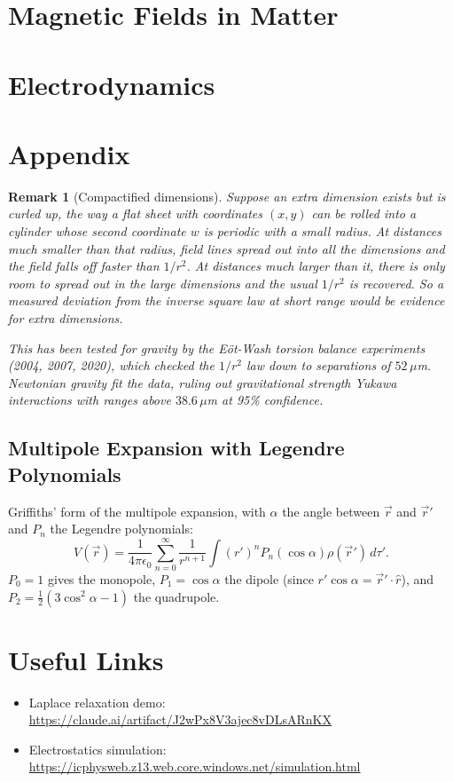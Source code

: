 \documentclass{article}
\newtheorem{remark}{Remark}
\begin{document}
\section{Magnetic Fields in Matter}


\section{Electrodynamics}

\newpage
\appendix
\section{Appendix}
\begin{remark}[Compactified dimensions]
    Suppose an extra dimension exists but is curled up, the way a flat sheet with coordinates $(x,y)$ can be rolled into a cylinder whose second coordinate $w$ is periodic with a small radius. At distances much smaller than that radius, field lines spread out into all the dimensions and the field falls off faster than $1/r^2$. At distances much larger than it, there is only room to spread out in the large dimensions and the usual $1/r^2$ is recovered. So a measured deviation from the inverse square law at short range would be evidence for extra dimensions.\par
    This has been tested for gravity by the E\"ot-Wash torsion balance experiments (2004, 2007, 2020), which checked the $1/r^2$ law down to separations of $52\,\mu$m. Newtonian gravity fit the data, ruling out gravitational strength Yukawa interactions with ranges above $38.6\,\mu$m at 95\% confidence.
\end{remark}

\subsection{Multipole Expansion with Legendre Polynomials}
\label{app:legendre}
Griffiths' form of the multipole expansion, with $\alpha$ the angle between $\vec{r}$ and $\vec{r}'$ and $P_n$ the Legendre polynomials:
\[V(\vec{r}) = \frac{1}{4\pi\epsilon_0}\sum_{n=0}^{\infty}\frac{1}{r^{n+1}}\int(r')^nP_n(\cos\alpha)\rho(\vec{r}')\,d\tau'.\]
$P_0 = 1$ gives the monopole, $P_1 = \cos\alpha$ the dipole (since $r'\cos\alpha = \vec{r}'\cdot\hat{r}$), and $P_2 = \frac{1}{2}(3\cos^2\alpha - 1)$ the quadrupole.


\section{Useful Links}
\begin{itemize}
    \item Laplace relaxation demo:\\ \url{https://claude.ai/artifact/J2wPx8V3ajec8vDLsARnKX}
    \item Electrostatics simulation:\\ \url{https://icphysweb.z13.web.core.windows.net/simulation.html}
\end{itemize}
\end{document}
